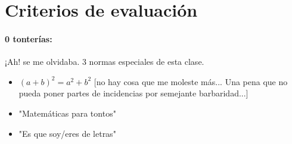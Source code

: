 \documentclass[palatino,nosec]{Docencia}
\begin{document}
\section{Criterios de evaluación}

\paragraph{0 tonterías:} ¡Ah! se me olvidaba. 3 normas especiales de esta clase.

\begin{itemize}
	\item $(a+b)^2 = a^2 + b^2$ [no hay cosa que me moleste más... Una pena que no pueda poner partes de incidencias por semejante barbaridad...]
	\item "Matemáticas para tontos"
	\item "Es que soy/eres de letras"
\end{itemize}


%
%



\printindex
\end{document}
